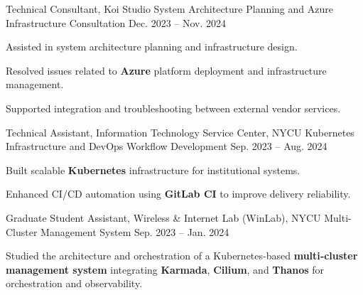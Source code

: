 \begin{cventries}
  \cventry
  {Technical Consultant, Koi Studio} %
  {System Architecture Planning and Azure Infrastructure Consultation} %
  {} %
  {Dec. 2023 -- Nov. 2024} %
  {
    \begin{cvitems}
      \item {Assisted in system architecture planning and infrastructure design.}
      \item {Resolved issues related to \textbf{Azure} platform deployment and infrastructure management.}
      \item {Supported integration and troubleshooting between external vendor services.}
    \end{cvitems}
  }

  \cventry
  {Technical Assistant, Information Technology Service Center, NYCU} %
  {Kubernetes Infrastructure and DevOps Workflow Development} %
  {} %
  {Sep. 2023 -- Aug. 2024} %
  {
    \begin{cvitems}
      \item {Built scalable \textbf{Kubernetes} infrastructure for institutional systems.}
      \item {Enhanced CI/CD automation using \textbf{GitLab CI} to improve delivery reliability.}
    \end{cvitems}
  }

  
  \cventry
    {Graduate Student Assistant, Wireless \& Internet Lab (WinLab), NYCU} %
    {Multi-Cluster Management System} %
    {} %
    {Sep. 2023 -- Jan. 2024} %
    {
      \begin{cvitems}
        \item {Studied the architecture and orchestration of a Kubernetes‑based \textbf{multi‑cluster management system} integrating
\textbf{Karmada}, \textbf{Cilium}, and \textbf{Thanos} for orchestration and observability.}
      \end{cvitems}
    }




    
 
\end{cventries}
